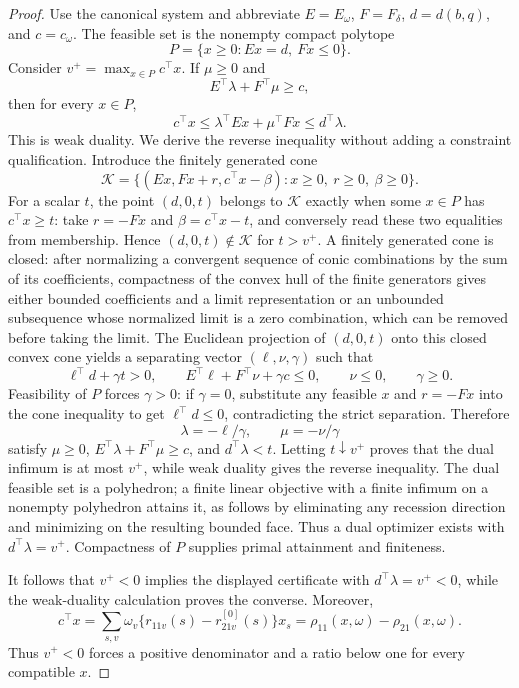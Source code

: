 \documentclass{article}
\begin{document}
\begin{proof}
Use the canonical system and abbreviate \(E=E_\omega\), \(F=F_\delta\), \(d=d(b,q)\), and \(c=c_\omega\).  The feasible set is the nonempty compact polytope
\[
P=\{x\geq0:Ex=d,\ Fx\leq0\}.
\]
Consider \(v^+=\max_{x\in P}c^\top x\).  If \(\mu\geq0\) and
\[
E^\top\lambda+F^\top\mu\geq c,
\]
then for every \(x\in P\),
\[
c^\top x\leq\lambda^\top Ex+\mu^\top Fx
\leq d^\top\lambda.
\]
This is weak duality.  We derive the reverse inequality without adding a constraint qualification.  Introduce the finitely generated cone
\[
\mathcal K=\{(Ex,Fx+r,c^\top x-\beta):x\geq0,\ r\geq0,\ \beta\geq0\}.
\]
For a scalar \(t\), the point \((d,0,t)\) belongs to \(\mathcal K\) exactly when some \(x\in P\) has \(c^\top x\geq t\): take \(r=-Fx\) and \(\beta=c^\top x-t\), and conversely read these two equalities from membership.  Hence \((d,0,t)\notin\mathcal K\) for \(t>v^+\).  A finitely generated cone is closed: after normalizing a convergent sequence of conic combinations by the sum of its coefficients, compactness of the convex hull of the finite generators gives either bounded coefficients and a limit representation or an unbounded subsequence whose normalized limit is a zero combination, which can be removed before taking the limit.  The Euclidean projection of \((d,0,t)\) onto this closed convex cone yields a separating vector \((\ell,\nu,\gamma)\) such that
\[
\ell^\top d+\gamma t>0,\qquad
E^\top\ell+F^\top\nu+\gamma c\leq0,\qquad
\nu\leq0,\qquad\gamma\geq0.
\]
Feasibility of \(P\) forces \(\gamma>0\): if \(\gamma=0\), substitute any feasible \(x\) and \(r=-Fx\) into the cone inequality to get \(\ell^\top d\leq0\), contradicting the strict separation.  Therefore
\[
\lambda=-\ell/\gamma,\qquad \mu=-\nu/\gamma
\]
satisfy \(\mu\geq0\), \(E^\top\lambda+F^\top\mu\geq c\), and \(d^\top\lambda<t\).  Letting \(t\downarrow v^+\) proves that the dual infimum is at most \(v^+\), while weak duality gives the reverse inequality.  The dual feasible set is a polyhedron; a finite linear objective with a finite infimum on a nonempty polyhedron attains it, as follows by eliminating any recession direction and minimizing on the resulting bounded face.  Thus a dual optimizer exists with \(d^\top\lambda=v^+\).  Compactness of \(P\) supplies primal attainment and finiteness.

It follows that \(v^+<0\) implies the displayed certificate with \(d^\top\lambda=v^+<0\), while the weak-duality calculation proves the converse.  Moreover,
\[
c^\top x=\sum_{s,v}\omega_v\{r_{11v}(s)-r^{[0]}_{21v}(s)\}x_s
=\rho_{11}(x,\omega)-\rho_{21}(x,\omega).
\]
Thus \(v^+<0\) forces a positive denominator and a ratio below one for every compatible \(x\).


\end{proof}
\end{document}

